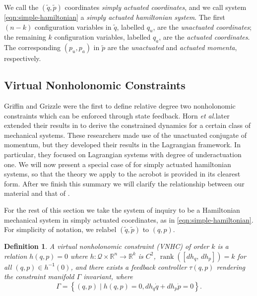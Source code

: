 \documentclass[journal,twoside,web]{ieeecolor}
\newtheorem{defn}{Definition} %
\DeclareMathOperator{\Rank}{rank}
\newcommand*{\rank}[1]{\Rank\left(#1\right)}
\newcommand*{\inv}{^\mathsf{-1}}
\newcommand*{\R}{\mathbb{R}}
\newcommand*{\etal}{\MakeLowercase{\textit{et al.}}}
\begin{document}
We call the \((\tilde{q},\tilde{p})\) coordinates
\textit{simply actuated coordinates}, and we call system
\eqref{eqn:simple-hamiltonian} a \textit{simply actuated hamiltonian system}.
The first \((n-k)\) configuration variables in \(\tilde{q}\), labelled \(q_u\),
are the \textit{unactuated coordinates}; 
the remaining \(k\) configuration variables, labelled \(q_a\), are the
\textit{actuated coordinates}.
The corresponding \((p_u, p_a)\) in \(\tilde{p}\) are the \textit{unactuated}
and \textit{actuated momenta}, respectively.

\subsection{Virtual Nonholonomic Constraints}\label{sec:vnhc-vnhc}

Griffin and Grizzle \cite{nhvc_dynamic_walking} were the first to define
relative degree two nonholonomic constraints which can be enforced
through state feedback.
Horn \etal later extended their results in
\cite{hybrid_zero_dynamics_bipedal_nhvcs} to derive the constrained dynamics for
a certain class of mechanical systems.
These researchers made use of the unactuated conjugate of momentum, but they
developed their results in the Lagrangian framework.
In particular, they focused on Lagrangian systems with degree of underactuation
one.
We will now present a special case of \cite{hybrid_zero_dynamics_bipedal_nhvcs}
for simply actuated hamiltonian systems, so that the theory we apply to the
acrobot is provided in its clearest form.
After we finish this summary we will clarify the relationship between our
material and that of \cite{hybrid_zero_dynamics_bipedal_nhvcs}.

For the rest of this section we take the system of inquiry to be a
Hamiltonian mechanical system in simply actuated coordinates, as in
\eqref{eqn:simple-hamiltonian}.
For simplicity of notation, we relabel \((\tilde{q},\tilde{p})\) to \((q,p)\).

\begin{defn}\label{defn:vnhc}
    A \textit{virtual nonholonomic constraint} (VNHC) \textit{of order \(k\)} is a
    relation \(h(q,p) = 0\) where \(h : \mathcal{Q}\times\R^n \rightarrow \R^k\) is
    \(C^2\), \(\rank{\left[ dh_q,\, dh_p \right]} = k\) for all 
    \((q,p) \in h\inv(0)\), and there exists a feedback controller \(\tau(q,p)\)
    rendering the \textit{constraint manifold} \(\Gamma\) invariant,
    where
    \begin{equation}
        \Gamma = \left\{(q,p) \mid h(q,p) = 0, dh_q \dot{q} + dh_p \dot{p} = 0\right\}
        .
    \end{equation}
\end{defn}
\end{document}

